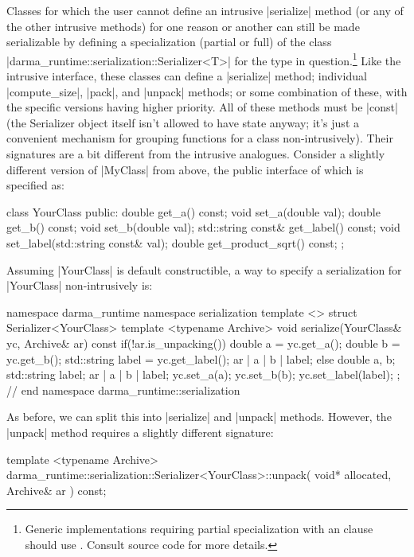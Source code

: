 Classes for which the user cannot define an intrusive |serialize| method (or
any of the other intrusive methods) for one reason or another can still be
made serializable by defining a specialization (partial or full) of the class
|darma_runtime::serialization::Serializer<T>| for the type in
question.\footnote{Generic implementations requiring partial specialization
  with an  clause should use
.  Consult source code for more details.}  Like the intrusive interface,
these classes can define a |serialize| method; individual |compute_size|,
|pack|, and |unpack| methods; or some combination of these, with the specific
versions having higher priority.  All of these methods must be |const| (the
Serializer object itself isn't allowed to have state anyway; it's just a
convenient mechanism for grouping functions for a class non-intrusively).  Their
signatures are a bit different from the intrusive analogues.  Consider a
slightly different version of |MyClass| from above, the public
interface of which is specified as:
\begin{CppCodeNumb}
class YourClass {
  public:
    double get_a() const;
    void set_a(double val);
    double get_b() const;
    void set_b(double val);
    std::string const& get_label() const;
    void set_label(std::string const& val);
    double get_product_sqrt() const;
};
\end{CppCodeNumb}
Assuming |YourClass| is default constructible, a way to specify a serialization
for |YourClass| non-intrusively is:
\begin{CppCodeNumb}
namespace darma_runtime { namespace serialization {
template <>
struct Serializer<YourClass> {
  template <typename Archive>
  void serialize(YourClass& yc, Archive& ar) const {
    if(!ar.is_unpacking()) {
      double a = yc.get_a();
      double b = yc.get_b();
      std::string label = yc.get_label();
      ar | a | b | label;
    }
    else {
      double a, b;
      std::string label;
      ar | a | b | label;
      yc.set_a(a);
      yc.set_b(b);
      yc.set_label(label);
    }
  }
};
}} // end namespace darma_runtime::serialization
\end{CppCodeNumb}
As before, we can split this into |serialize| and |unpack| methods.  However,
the |unpack| method requires a slightly different signature:
\begin{CppCodeNumb}
template <typename Archive>
darma_runtime::serialization::Serializer<YourClass>::unpack(
  void* allocated, Archive& ar
) const;
\end{CppCodeNumb}
